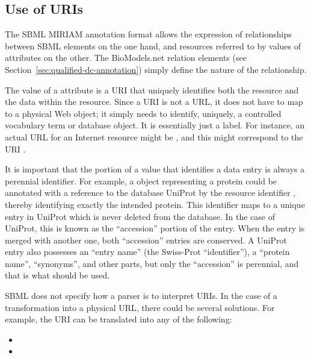 
\subsection{Use of URIs}
\label{sec:uri-in-annotation}

The SBML MIRIAM annotation format allows the expression of
relationships between SBML elements on the one hand, and resources
referred to by values of  attributes on the
other.  The BioModels.net relation elements (see
Section~\ref{sec:qualified-dc-annotation}) simply define the
nature of the relationship.

The value of a  attribute is a URI that
uniquely identifies both the resource and the data within the
resource.  Since a URI is not a URL, it does not have to map to a
physical Web object; it simply needs to identify, uniquely, a
controlled vocabulary term or database object.  It is essentially
just a label.  For instance, an actual URL for an Internet
resource might be , and
this might correspond to the URI .

It is important that the portion of a  value
that identifies a data entry is always a perennial identifier.
For example, a \Species object representing a protein could be
annotated with a reference to the database UniProt by the resource
identifier , thereby identifying
exactly the intended protein.  This identifier maps to a unique
entry in UniProt which is never deleted from the database.  In the
case of UniProt, this is known as the ``accession'' portion of the
entry.  When the entry is merged with another one, both
``accession'' entries are conserved.  A UniProt entry also
possesses an ``entry name'' (the Swiss-Prot ``identifier''), a
``protein name'', ``synonyms'', and other parts, but only the
``accession'' is perennial, and that is what should be used.

SBML does not specify how a parser is to interpret URIs. In the
case of a transformation into a physical URL, there could be
several solutions. For example, the URI
 can be translated into any
of the following:
\begin{itemize}\setlength{\parskip}{-0.7ex}

\item {}
\item {}

\end{itemize}\vspace*{-0.5ex}


